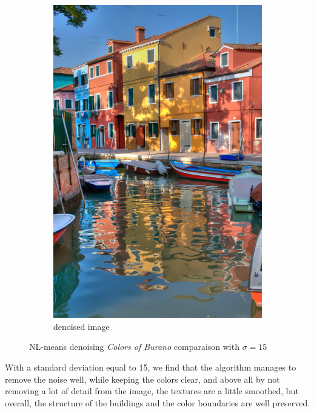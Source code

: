 \documentclass[a4paper, twocolumn, twoside]{article}
\begin{document}
\begin{figure}[h!]
\begin{subfigure}{.32\textwidth}
        \includegraphics[width=\linewidth]{images/denoised.png}
        \caption{denoised image}
    \end{subfigure}
	\caption{NL-means denoising \textit{Colors of Burano} \cite{color} comparaison with $\sigma = 15$}
\end{figure}
With a standard deviation equal to 15, we find that the algorithm manages to remove the noise well,
while keeping the colors clear, and above all by not removing a lot of detail from the image,
the textures are a little smoothed, but overall, the structure of the buildings and the color boundaries 
are well preserved.\\
\end{document}
